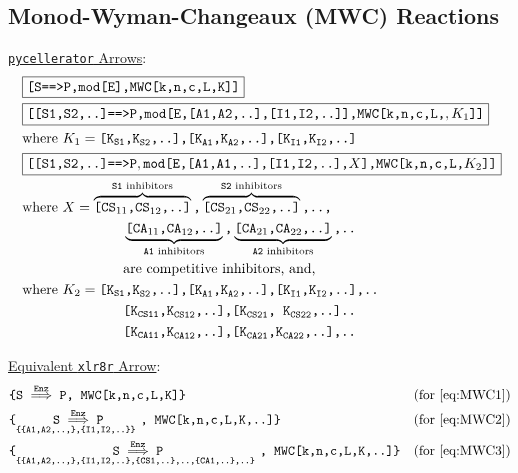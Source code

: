 \subsection{Monod-Wyman-Changeaux (MWC) Reactions}
\label{subsection:MWC}
\underline{{\tt pycellerator} Arrows}:
\begin{align}
&\boxed{\text{\tt[S==>P,mod[E],MWC[k,n,c,L,K]]}} \label{eq:MWC1}\\
&\boxed{\text{\tt[[S1,S2,..]==>P,mod[E,[A1,A2,..],[I1,I2,..]],MWC[k,n,c,L,},K_1\text{\tt]]}} \label{eq:MWC2}\\\
&\text{where }K_1 = \text{\tt{[K}}_{\text{\tt{S1}}}\text{\tt{,K}}_{\text{\tt{S2}}}\text{\tt{,..],[K}}_{\text{\tt{A1}}}\text{\tt{,K}}_{\text{\tt{A2}}}\text{\tt{,..],[K}}_{\text{\tt{I1}}}\text{\tt{,K}}_{\text{\tt{I2}}}\text{\tt{,..]}}\\
&\boxed{
\text{\tt[[S1,S2,..]==>P},\text{\tt mod[E,[A1,A1,..],[I1,I2,..],}X \text{\tt],} \text{\tt MWC[k,n,c,L,}K_2\text{\tt]]}
} \label{eq:MWC3}\\
&\text{where }
X = \overbrace{\text{\tt{[CS}}_{11}\text{\tt{,CS}}_{12}\text{\tt{,..]}}}^{\text{{\tt S1} inhibitors}} \text{\tt{,}}
    \overbrace{\text{\tt{[CS}}_{21}\text{\tt{,CS}}_{22}\text{\tt{,..]}}}^{\text{{\tt S2} inhibitors}} \text{\tt{,..,}}\nonumber\\&\hspace{1in}
    \underbrace{\text{\tt{[CA}}_{11}\text{\tt{,CA}}_{12}\text{\tt{,..]}}}_{\text{{\tt A1} inhibitors}} \text{\tt{,}}
    \underbrace{\text{\tt{[CA}}_{21}\text{\tt{,CA}}_{22}\text{\tt{,..]}}}_{\text{{\tt A2} inhibitors}}  \text{\tt{,..}}\\&\hspace{1in}
\text{are competitive inhibitors, and, } \nonumber\\
&\text{where }K_2 = \text{\tt{[K}}_{\text{\tt{S1}}}\text{\tt{,K}}_{\text{\tt{S2}}}\text{\tt{,..],[K}}_{\text{\tt{A1}}}\text{\tt{,K}}_{\text{\tt{A2}}}\text{\tt{,..],[K}}_{\text{\tt{I1}}}\text{\tt{,K}}_{\text{\tt{I2}}}\text{\tt{,..],..}}\nonumber\\
&\hspace{1in}\text{\tt{[K}}_{\text{\tt{CS11}}} \text{\tt{,K}}_{\text{\tt{CS12}}}\text{\tt{,..],[K}}_{\text{\tt{CS21}}}\text{\tt{, K}}_{\text{\tt{CS22}}}\text{\tt{,..]..}}\nonumber \\
&\hspace{1in}\text{\tt{[K}}_{\text{\tt{CA11}}}\text{\tt{,K}}_{\text{\tt{CA12}}}\text{\tt{,..],[K}}_{\text{\tt{CA21}}}\text{\tt{,K}}_{\text{\tt{CA22}}}\text{\tt{,..],..}}
\end{align}

\underline{Equivalent {\tt xlr8r} Arrow}: 
\begin{align*}
&\text{\tt{\{S}} \overset{\text{\tt{Enz}}}{\implies} \text{\tt{P, MWC[k,n,c,L,K]}} \text{\tt{\}}}&\text{(for \eqref{eq:MWC1})}\\
&\text{\tt{\{}} \underset{\text{\tt \{\{A1,A2,..,\},\{I1,I2,..\}\} }}{ {\text{\tt{S}} \overset{\text{\tt{Enz}}}{\implies} \text{\tt{P}}}} \text{\tt{, MWC[k,n,c,L,K,..]}} \text{\tt{\}}}&\text{(for \eqref{eq:MWC2})}\\
&\text{\tt{\{}} \underset{\text{\tt \{\{A1,A2,..,\},\{I1,I2,..\},\{CS1,..\},..,\{CA1,..\},..\} }}{ {\text{\tt{S}} \overset{\text{\tt{Enz}}}{\implies} \text{\tt{P}}}} \text{\tt{, MWC[k,n,c,L,K,..]}} \text{\tt{\}}}&\text{(for \eqref{eq:MWC3})}
\end{align*}

